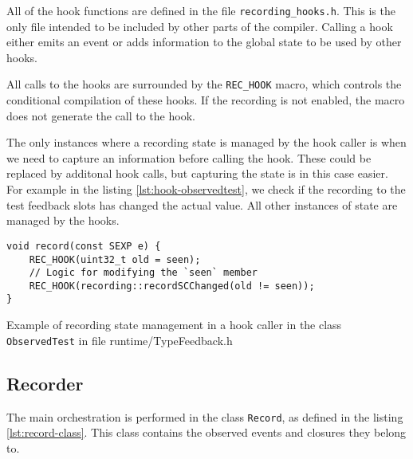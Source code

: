 All of the hook functions are defined in the file \texttt{recording\_hooks.h}. This is the only file intended to be included by other parts of the compiler. Calling a hook either emits an event or adds information to the global state to be used by other hooks.

All calls to the hooks are surrounded by the \texttt{REC\_HOOK} macro, which controls the conditional compilation of these hooks. If the recording is not enabled, the macro does not generate the call to the hook.

The only instances where a recording state is managed by the hook caller is when we need to capture an information before calling the hook. These could be replaced by additonal hook calls, but capturing the state is in this case easier. For example in the listing \ref{lst:hook-observedtest}, we check if the recording to the test feedback slots has changed the actual value. All other instances of state are managed by the hooks.

\begin{listing}
	\centering
	\begin{verbatim}
void record(const SEXP e) {
    REC_HOOK(uint32_t old = seen);
    // Logic for modifying the `seen` member
    REC_HOOK(recording::recordSCChanged(old != seen));
}
  \end{verbatim}
	\caption{Example of recording state management in a hook caller in the class \texttt{ObservedTest} in file runtime/TypeFeedback.h}\label{lst:hook-observedtest}
\end{listing}

\subsection{Recorder}

The main orchestration is performed in the class \texttt{Record}, as defined in the listing \ref{lst:record-class}. This class contains the observed events and closures they belong to.

